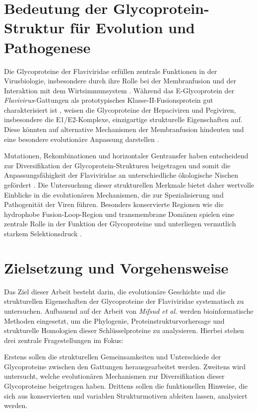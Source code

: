 \section{Bedeutung der Glycoprotein-Struktur für Evolution und Pathogenese}
\label{sec:bedeutung-der-glycoprotein-struktur-fuer-evolution-und-pathogenese}

Die Glycoproteine der Flaviviridae erfüllen zentrale Funktionen in der Virusbiologie, insbesondere durch ihre Rolle bei der Membranfusion und der Interaktion mit dem Wirtsimmunsystem \autocite{Heinz2012}. Während das E-Glycoprotein der \textit{Flavivirus}-Gattungen als prototypisches Klasse-II-Fusionsprotein gut charakterisiert ist \autocite{kuhnStructureDengueVirus2002}, weisen die Glycoproteine der Hepaciviren und Pegiviren, insbesondere die E1/E2-Komplexe, einzigartige strukturelle Eigenschaften auf. Diese könnten auf alternative Mechanismen der Membranfusion hindeuten und eine besondere evolutionäre Anpassung darstellen \autocite{Lavie2017}.

Mutationen, Rekombinationen und horizontaler Gentransfer haben entscheidend zur Diversifikation der Glycoprotein-Strukturen beigetragen und somit die Anpassungsfähigkeit der Flaviviridae an unterschiedliche ökologische Nischen gefördert \autocite{Weaver2009}. Die Untersuchung dieser strukturellen Merkmale bietet daher wertvolle Einblicke in die evolutionären Mechanismen, die zur Spezialisierung und Pathogenität der Viren führen. Besonders konservierte Regionen wie die hydrophobe Fusion-Loop-Region und transmembrane Domänen spielen eine zentrale Rolle in der Funktion der Glycoproteine und unterliegen vermutlich starkem Selektionsdruck \autocite{Modis2004}.

\section{Zielsetzung und Vorgehensweise}
\label{sec:zielsetzung-und-vorgehensweise}

Das Ziel dieser Arbeit besteht darin, die evolutionäre Geschichte und die strukturellen Eigenschaften der Glycoproteine der Flaviviridae systematisch zu untersuchen. Aufbauend auf der Arbeit von \textit{Mifsud et al.} \autocite{mifsudMappingGlycoproteinStructure2024} werden bioinformatische Methoden eingesetzt, um die Phylogenie, Proteinstrukturvorhersage und strukturelle Homologien dieser Schlüsselproteine zu analysieren. Hierbei stehen drei zentrale Fragestellungen im Fokus:

Erstens sollen die strukturellen Gemeinsamkeiten und Unterschiede der Glycoproteine zwischen den Gattungen herausgearbeitet werden. Zweitens wird untersucht, welche evolutionären Mechanismen zur Diversifikation dieser Glycoproteine beigetragen haben. Drittens sollen die funktionellen Hinweise, die sich aus konservierten und variablen Strukturmotiven ableiten lassen, analysiert werden.

